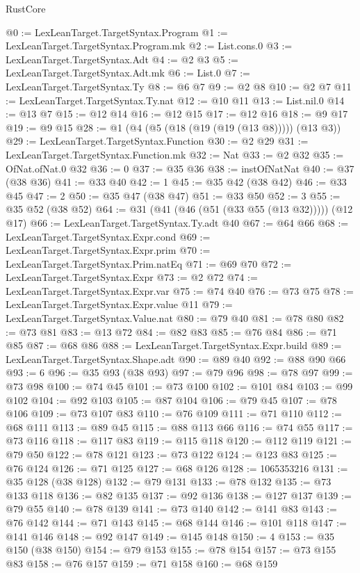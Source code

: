 \begin{lexlean}{RustCore}
\begin{coremodule}
@0 := LexLeanTarget.TargetSyntax.Program
@1 := LexLeanTarget.TargetSyntax.Program.mk
@2 := List.cons.{0}
@3 := LexLeanTarget.TargetSyntax.Adt
@4 := @2 @3
@5 := LexLeanTarget.TargetSyntax.Adt.mk
@6 := List.{0}
@7 := LexLeanTarget.TargetSyntax.Ty
@8 := @6 @7
@9 := @2 @8
@10 := @2 @7
@11 := LexLeanTarget.TargetSyntax.Ty.nat
@12 := @10 @11
@13 := List.nil.{0}
@14 := @13 @7
@15 := @12 @14
@16 := @12 @15
@17 := @12 @16
@18 := @9 @17
@19 := @9 @15
@28 := @1 (@4 (@5 (@18 (@19 (@19 (@13 @8))))) (@13 @3))
@29 := LexLeanTarget.TargetSyntax.Function
@30 := @2 @29
@31 := LexLeanTarget.TargetSyntax.Function.mk
@32 := Nat
@33 := @2 @32
@35 := OfNat.ofNat.{0} @32
@36 := 0
@37 := @35 @36
@38 := instOfNatNat
@40 := @37 (@38 @36)
@41 := @33 @40
@42 := 1
@45 := @35 @42 (@38 @42)
@46 := @33 @45
@47 := 2
@50 := @35 @47 (@38 @47)
@51 := @33 @50
@52 := 3
@55 := @35 @52 (@38 @52)
@64 := @31 (@41 (@46 (@51 (@33 @55 (@13 @32))))) (@12 @17)
@66 := LexLeanTarget.TargetSyntax.Ty.adt @40
@67 := @64 @66
@68 := LexLeanTarget.TargetSyntax.Expr.cond
@69 := LexLeanTarget.TargetSyntax.Expr.prim
@70 := LexLeanTarget.TargetSyntax.Prim.natEq
@71 := @69 @70
@72 := LexLeanTarget.TargetSyntax.Expr
@73 := @2 @72
@74 := LexLeanTarget.TargetSyntax.Expr.var
@75 := @74 @40
@76 := @73 @75
@78 := LexLeanTarget.TargetSyntax.Expr.value @11
@79 := LexLeanTarget.TargetSyntax.Value.nat
@80 := @79 @40
@81 := @78 @80
@82 := @73 @81
@83 := @13 @72
@84 := @82 @83
@85 := @76 @84
@86 := @71 @85
@87 := @68 @86
@88 := LexLeanTarget.TargetSyntax.Expr.build
@89 := LexLeanTarget.TargetSyntax.Shape.adt
@90 := @89 @40
@92 := @88 @90 @66
@93 := 6
@96 := @35 @93 (@38 @93)
@97 := @79 @96
@98 := @78 @97
@99 := @73 @98
@100 := @74 @45
@101 := @73 @100
@102 := @101 @84
@103 := @99 @102
@104 := @92 @103
@105 := @87 @104
@106 := @79 @45
@107 := @78 @106
@109 := @73 @107 @83
@110 := @76 @109
@111 := @71 @110
@112 := @68 @111
@113 := @89 @45
@115 := @88 @113 @66
@116 := @74 @55
@117 := @73 @116
@118 := @117 @83
@119 := @115 @118
@120 := @112 @119
@121 := @79 @50
@122 := @78 @121
@123 := @73 @122
@124 := @123 @83
@125 := @76 @124
@126 := @71 @125
@127 := @68 @126
@128 := 1065353216
@131 := @35 @128 (@38 @128)
@132 := @79 @131
@133 := @78 @132
@135 := @73 @133 @118
@136 := @82 @135
@137 := @92 @136
@138 := @127 @137
@139 := @79 @55
@140 := @78 @139
@141 := @73 @140
@142 := @141 @83
@143 := @76 @142
@144 := @71 @143
@145 := @68 @144
@146 := @101 @118
@147 := @141 @146
@148 := @92 @147
@149 := @145 @148
@150 := 4
@153 := @35 @150 (@38 @150)
@154 := @79 @153
@155 := @78 @154
@157 := @73 @155 @83
@158 := @76 @157
@159 := @71 @158
@160 := @68 @159

\end{coremodule}
\end{lexlean}
